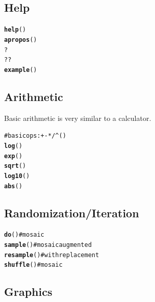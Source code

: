 \documentclass{report}\usepackage{graphicx, color}
\makeatletter
\newcommand{\hlfunctioncall}[1]{\textcolor[rgb]{0.501960784313725,0,0.329411764705882}{\textbf{#1}}}%
\newcommand{\hlcomment}[1]{\textcolor[rgb]{0.180392156862745,0.6,0.341176470588235}{#1}}%
\newenvironment{kframe}{%
 \def\at@end@of@kframe{}%
 \ifinner\ifhmode%
  \def\at@end@of@kframe{\end{minipage}}%
  \begin{minipage}{\columnwidth}%
 \fi\fi%
 \def\FrameCommand##1{\hskip\@totalleftmargin \hskip-\fboxsep
 \colorbox{shadecolor}{##1}\hskip-\fboxsep
     \hskip-\linewidth \hskip-\@totalleftmargin \hskip\columnwidth}%
 \MakeFramed {\advance\hsize-\width
   \@totalleftmargin\z@ \linewidth\hsize
   \@setminipage}}%
 {\par\unskip\endMakeFramed%
 \at@end@of@kframe}
\newenvironment{knitrout}{}{} %
\makeatother
\begin{document}
\begin{multicols}{4}
\raggedright

\subsection*{Help}
\begin{knitrout}
\color{fgcolor}\begin{kframe}
\begin{alltt}
\hlfunctioncall{help}()
\hlfunctioncall{apropos}()  
?
??
\hlfunctioncall{example}()
\end{alltt}
\end{kframe}
\end{knitrout}


\subsection*{Arithmetic}
Basic arithmetic is very similar to a calculator.
\begin{knitrout}
\color{fgcolor}\begin{kframe}
\begin{alltt}
\hlcomment{# basic ops: + - * / ^ ( )}
\hlfunctioncall{log}()
\hlfunctioncall{exp}()
\hlfunctioncall{sqrt}()
\hlfunctioncall{log10}()
\hlfunctioncall{abs}()
\end{alltt}
\end{kframe}
\end{knitrout}


\subsection*{Randomization/Iteration}
%
\begin{knitrout}
\color{fgcolor}\begin{kframe}
\begin{alltt}
\hlfunctioncall{do}()        \hlcomment{# mosaic}
\hlfunctioncall{sample}()    \hlcomment{# mosaic augmented}
\hlfunctioncall{resample}()  \hlcomment{# with replacement}
\hlfunctioncall{shuffle}()   \hlcomment{# mosaic}
\end{alltt}
\end{kframe}
\end{knitrout}


\subsection*{Graphics}


\end{multicols}
\end{document}
